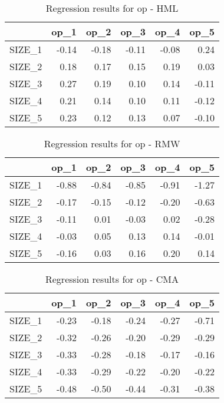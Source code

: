 \begin{table}[ht]
\centering
\caption{Regression results for op - HML} 
\begin{tabular}{rrrrrr}
  \hline
 & op\_1 & op\_2 & op\_3 & op\_4 & op\_5 \\ 
  \hline
SIZE\_1 & -0.14 & -0.18 & -0.11 & -0.08 & 0.24 \\ 
  SIZE\_2 & 0.18 & 0.17 & 0.15 & 0.19 & 0.03 \\ 
  SIZE\_3 & 0.27 & 0.19 & 0.10 & 0.14 & -0.11 \\ 
  SIZE\_4 & 0.21 & 0.14 & 0.10 & 0.11 & -0.12 \\ 
  SIZE\_5 & 0.23 & 0.12 & 0.13 & 0.07 & -0.10 \\ 
   \hline
\end{tabular}
\end{table}


\begin{table}[ht]
\centering
\caption{Regression results for op - RMW} 
\begin{tabular}{rrrrrr}
  \hline
 & op\_1 & op\_2 & op\_3 & op\_4 & op\_5 \\ 
  \hline
SIZE\_1 & -0.88 & -0.84 & -0.85 & -0.91 & -1.27 \\ 
  SIZE\_2 & -0.17 & -0.15 & -0.12 & -0.20 & -0.63 \\ 
  SIZE\_3 & -0.11 & 0.01 & -0.03 & 0.02 & -0.28 \\ 
  SIZE\_4 & -0.03 & 0.05 & 0.13 & 0.14 & -0.01 \\ 
  SIZE\_5 & -0.16 & 0.03 & 0.16 & 0.20 & 0.14 \\ 
   \hline
\end{tabular}
\end{table}


\begin{table}[ht]
\centering
\caption{Regression results for op - CMA} 
\begin{tabular}{rrrrrr}
  \hline
 & op\_1 & op\_2 & op\_3 & op\_4 & op\_5 \\ 
  \hline
SIZE\_1 & -0.23 & -0.18 & -0.24 & -0.27 & -0.71 \\ 
  SIZE\_2 & -0.32 & -0.26 & -0.20 & -0.29 & -0.29 \\ 
  SIZE\_3 & -0.33 & -0.28 & -0.18 & -0.17 & -0.16 \\ 
  SIZE\_4 & -0.33 & -0.29 & -0.22 & -0.20 & -0.22 \\ 
  SIZE\_5 & -0.48 & -0.50 & -0.44 & -0.31 & -0.38 \\ 
   \hline
\end{tabular}
\end{table}


